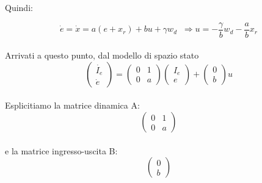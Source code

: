 \documentclass[a4paper,13pt]{article}
\begin{document}
	Quindi:

\begin{equation*}
	\dot{e}=\dot{x}=a(e+x_{r})+bu+\gamma w_{d}\,\,\:           %
	\Rightarrow u=-\frac{\gamma}{b} w_{d}-\frac{a}{b} x_{r}
\end{equation*} \\

	Arrivati a questo punto, dal modello di spazio stato\\
\begin{equation*}	
\begin{pmatrix}
	
	\dot{I_{e}} \\ \dot{e}
	
\end{pmatrix} =         %
\begin{pmatrix}

	0&1\\0&a

\end{pmatrix}
\begin{pmatrix}

	I_{e}\\e

\end{pmatrix} +           %
\begin{pmatrix}

	0\\b

\end{pmatrix} u
\end{equation*} \\

	Esplicitiamo la matrice dinamica A:        %
\begin{equation*}
\begin{pmatrix}

	0&1\\0&a

\end{pmatrix}
\end{equation*} \\

	e la matrice ingresso-uscita B:          %
\begin{equation*}
\begin{pmatrix}

	0\\b

\end{pmatrix}
\end{equation*} \\
\end{document}
